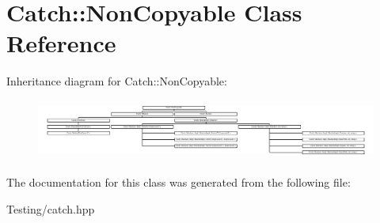 \hypertarget{class_catch_1_1_non_copyable}{\section{Catch\-:\-:Non\-Copyable Class Reference}
\label{class_catch_1_1_non_copyable}
}
Inheritance diagram for Catch\-:\-:Non\-Copyable\-:\begin{figure}[H]
\begin{center}
\leavevmode
\includegraphics[height=2.004474cm]{class_catch_1_1_non_copyable}
\end{center}
\end{figure}


The documentation for this class was generated from the following file\-:\begin{DoxyCompactItemize}
\item 
Testing/catch.\-hpp\end{DoxyCompactItemize}
